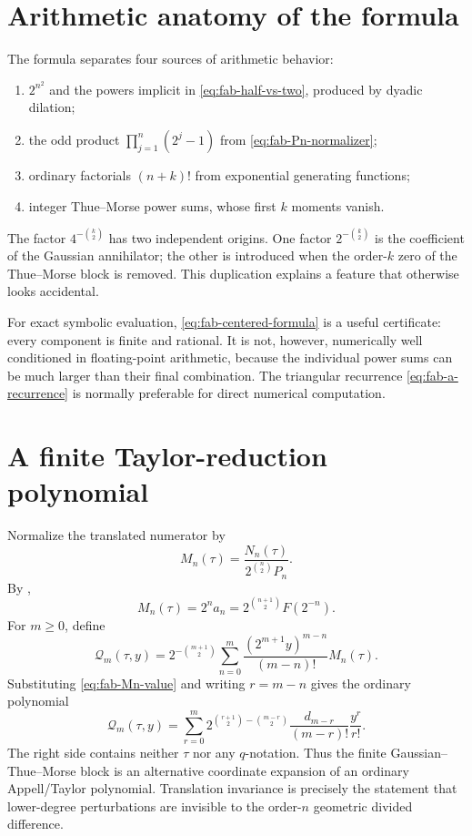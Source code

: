 \documentclass[11pt,oneside,openany]{book}
\theoremstyle{definition}
\theoremstyle{remark}
\begin{document}
\section{Arithmetic anatomy of the formula}

The formula separates four sources of arithmetic behavior:
\begin{enumerate}
\item $2^{n^2}$ and the powers implicit in \eqref{eq:fab-half-vs-two}, produced by dyadic dilation;
\item the odd product $\prod_{j=1}^n(2^j-1)$ from \eqref{eq:fab-Pn-normalizer};
\item ordinary factorials $(n+k)!$ from exponential generating functions;
\item integer Thue--Morse power sums, whose first $k$ moments vanish.
\end{enumerate}
The factor $4^{-\binom k2}$ has two independent origins.  One factor $2^{-\binom k2}$ is the coefficient of the Gaussian annihilator; the other is introduced when the order-$k$ zero of the Thue--Morse block is removed.  This duplication explains a feature that otherwise looks accidental.

For exact symbolic evaluation, \eqref{eq:fab-centered-formula} is a useful certificate: every component is finite and rational.  It is not, however, numerically well conditioned in floating-point arithmetic, because the individual power sums can be much larger than their final combination.  The triangular recurrence \eqref{eq:fab-a-recurrence} is normally preferable for direct numerical computation.

\section{A finite Taylor-reduction polynomial}

Normalize the translated numerator by
\begin{equation}
 M_n(\tau)=\frac{N_n(\tau)}{2^{\binom n2}P_n}.
 \label{eq:fab-Mn}
\end{equation}
By ,
\begin{equation}
 M_n(\tau)=2^na_n
 =2^{\binom{n+1}{2}}F(2^{-n}).
 \label{eq:fab-Mn-value}
\end{equation}
For $m\ge0$, define
\begin{equation}
 \mathcal Q_m(\tau,y)
 =2^{-\binom{m+1}{2}}
  \sum_{n=0}^m\frac{(2^{m+1}y)^{m-n}}{(m-n)!}M_n(\tau).
 \label{eq:fab-Qm}
\end{equation}
Substituting \eqref{eq:fab-Mn-value} and writing $r=m-n$ gives the ordinary polynomial
\begin{equation}
 \mathcal Q_m(\tau,y)
 =\sum_{r=0}^m
 2^{\binom{r+1}{2}-\binom{m-r}{2}}
 \frac{d_{m-r}}{(m-r)!}\frac{y^r}{r!}.
 \label{eq:fab-Qm-classical}
\end{equation}
The right side contains neither $\tau$ nor any $q$-notation.  Thus the finite Gaussian--Thue--Morse block is an alternative coordinate expansion of an ordinary Appell/Taylor polynomial.  Translation invariance is precisely the statement that lower-degree perturbations are invisible to the order-$n$ geometric divided difference.
\end{document}
